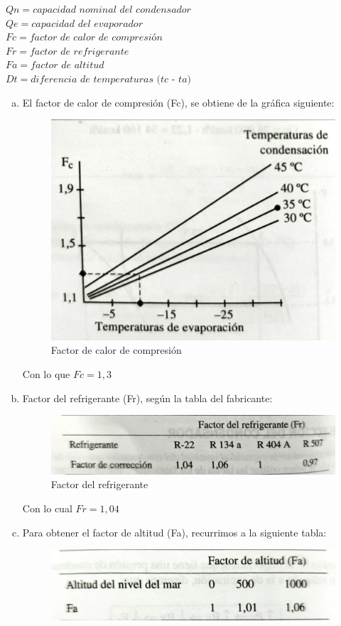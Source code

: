 $Qn = \textit{capacidad nominal del condensador}$\\
$Qe = \textit{capacidad del evaporador}$\\
$Fc = \textit{factor de calor de compresi\'on}$\\
$Fr = \textit{factor de refrigerante}$\\
$Fa = \textit{factor de altitud}$\\
$Dt = \textit{diferencia de temperaturas (tc - ta)}$\\
\begin{enumerate}[a.]
    \item El factor de calor de compresi\'on (Fc), se obtiene de la gr\'afica siguiente:
    \begin{figure}[H]
        \centering
        \includegraphics[width=.6\linewidth]{figuras/condensadores/factor de calor de compresion.jpg}
        \caption{Factor de calor de compresi\'on}
        \label{fig:Factor de calor de compresi\'on}
    \end{figure}
    Con lo que $Fc = 1,3$
    \item Factor del refrigerante (Fr), seg\'un la tabla del fabricante:
    \begin{figure}[H]
        \centering
        \includegraphics[width=.7\linewidth]{figuras/condensadores/factor del refrigerante.jpg}
        \caption{Factor del refrigerante}
        \label{fig:Factor del refrigerante}
    \end{figure}
    Con lo cual $Fr = 1,04$
    \item Para obtener el factor de altitud (Fa), recurrimos a la siguiente tabla:
    \begin{figure}[H]
        \centering
        \includegraphics[width=.6\linewidth]{figuras/condensadores/factor de altitud.jpg}

\end{figure}
\end{enumerate}
